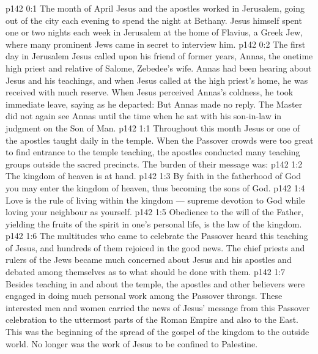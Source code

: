 \author{Midwayer Commission}
\vs p142 0:1 The month of April Jesus and the apostles worked in Jerusalem, going out of the city each evening to spend the night at Bethany. Jesus himself spent one or two nights each week in Jerusalem at the home of Flavius, a Greek Jew, where many prominent Jews came in secret to interview him.
\vs p142 0:2 \pc The first day in Jerusalem Jesus called upon his friend of former years, Annas, the onetime high priest and relative of Salome, Zebedee’s wife. Annas had been hearing about Jesus and his teachings, and when Jesus called at the high priest’s home, he was received with much reserve. When Jesus perceived Annas’s coldness, he took immediate leave, saying as he departed:  But Annas made no reply. The Master did not again see Annas until the time when he sat with his son\hyp{}in\hyp{}law in judgment on the Son of Man.
\vs p142 1:1 Throughout this month Jesus or one of the apostles taught daily in the temple. When the Passover crowds were too great to find entrance to the temple teaching, the apostles conducted many teaching groups outside the sacred precincts. The burden of their message was:
\vs p142 1:2 \bibnobreakspace The kingdom of heaven is at hand.
\vs p142 1:3 \bibnobreakspace By faith in the fatherhood of God you may enter the kingdom of heaven, thus becoming the sons of God.
\vs p142 1:4 \bibnobreakspace Love is the rule of living within the kingdom --- supreme devotion to God while loving your neighbour as yourself.
\vs p142 1:5 \bibnobreakspace Obedience to the will of the Father, yielding the fruits of the spirit in one’s personal life, is the law of the kingdom.
\vs p142 1:6 \pc The multitudes who came to celebrate the Passover heard this teaching of Jesus, and hundreds of them rejoiced in the good news. The chief priests and rulers of the Jews became much concerned about Jesus and his apostles and debated among themselves as to what should be done with them.
\vs p142 1:7 Besides teaching in and about the temple, the apostles and other believers were engaged in doing much personal work among the Passover throngs. These interested men and women carried the news of Jesus’ message from this Passover celebration to the uttermost parts of the Roman Empire and also to the East. This was the beginning of the spread of the gospel of the kingdom to the outside world. No longer was the work of Jesus to be confined to Palestine.
